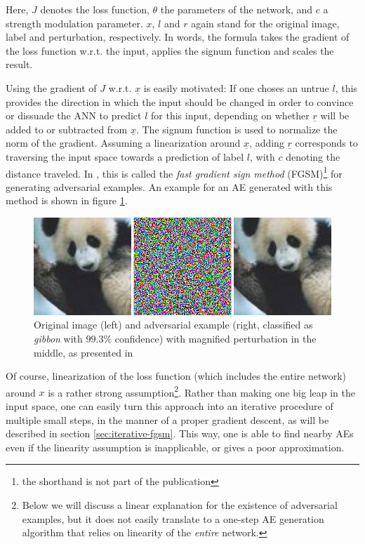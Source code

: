 \documentclass[11pt, a4paper]{article}
\renewcommand{\vec}[1]{\underline{#1}}
\begin{document}
Here, $J$ denotes the loss function, $\theta$ the parameters of the network, and $c$ a strength modulation parameter. $x$, $l$ and $r$ again stand for the original image, label and perturbation, respectively. In words, the formula takes the gradient of the loss function w.r.t. the input, applies the signum function and scales the result.

Using the gradient of $J$ w.r.t. $\vec{x}$ is easily motivated: If one choses an untrue $l$, this provides the direction in which the input should be changed in order to convince or dissuade the ANN to predict $l$ for this input, depending on whether $\vec{r}$ will be added to or subtracted from $\vec{x}$. The signum function is used to normalize the norm of the gradient. Assuming a linearization around $\vec{x}$, adding $\vec{r}$ corresponds to traversing the input space towards a prediction of label $l$, with $c$ denoting the distance traveled. In \cite{explaining-and-harnessing-adversarial-examples}, this is called the \emph{fast gradient sign method} (FGSM)\footnote{the shorthand is not part of the publication} for generating adversarial examples. An example for an AE generated with this method is shown in figure \ref{fig:harnessing-ae}.

\begin{figure}[h!tb]
	\centering
	\includegraphics[width=\textwidth]{images/harnessing_ae.png}
	\caption[Adversarial example created via FGSM, from \cite{explaining-and-harnessing-adversarial-examples}]{Original image (left) and adversarial example (right, classified as \emph{gibbon} with $99.3\%$ confidence) with magnified perturbation in the middle, as presented in \cite{explaining-and-harnessing-adversarial-examples}}
	\label{fig:harnessing-ae}
\end{figure}

Of course, linearization of the loss function (which includes the entire network) around $x$ is a rather strong assumption\footnote{Below we will discuss a linear explanation for the existence of adversarial examples, but it does not easily translate to a one-step AE generation algorithm that relies on linearity of the \emph{entire} network.}. Rather than making one big leap in the input space, one can easily turn this approach into an iterative procedure of multiple small steps, in the manner of a proper gradient descent, as will be described in section \ref{sec:iterative-fgsm}. This way, one is able to find nearby AEs even if the linearity assumption is inapplicable, or gives a poor approximation.
\end{document}
